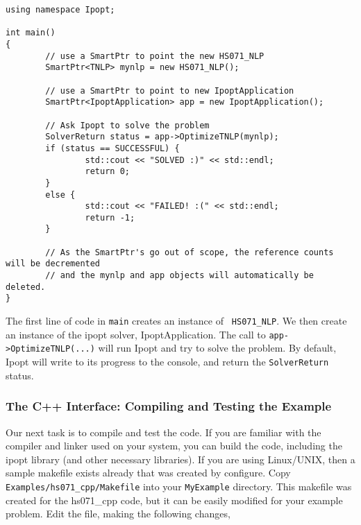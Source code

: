 \documentclass[letter,10pt]{article}
\begin{document}
{\begin{verbatim}
using namespace Ipopt;

int main()
{
        // use a SmartPtr to point the new HS071_NLP
        SmartPtr<TNLP> mynlp = new HS071_NLP();
        
        // use a SmartPtr to point to new IpoptApplication
        SmartPtr<IpoptApplication> app = new IpoptApplication();

        // Ask Ipopt to solve the problem
        SolverReturn status = app->OptimizeTNLP(mynlp);
        if (status == SUCCESSFUL) {
                std::cout << "SOLVED :)" << std::endl;
                return 0;
        }
        else {
                std::cout << "FAILED! :(" << std::endl;
                return -1;
        }
        
        // As the SmartPtr's go out of scope, the reference counts will be decremented
        // and the mynlp and app objects will automatically be deleted.
}
\end{verbatim} 

The first line of code in {\tt main} creates an instance of {\tt
HS071\_NLP}. We then create an instance of the ipopt solver,
IpoptApplication. The call to {\tt app->OptimizeTNLP(...)} will run
Ipopt and try to solve the problem. By default, Ipopt will write to
its progress to the console, and return the {\tt SolverReturn} status.

\subsubsection{The C++ Interface: Compiling and Testing the Example}
Our next task is to compile and test the code. If you are familiar
with the compiler and linker used on your system, you can build the
code, including the ipopt library (and other necessary libraries).  If
you are using Linux/UNIX, then a sample makefile exists already that was
created by configure. Copy {\tt Examples/hs071\_cpp/Makefile} into
your {\tt MyExample} directory. This makefile was created for the
hs071\_cpp code, but it can be easily modified for your example
problem. Edit the file, making the following changes,

}
\end{document}

